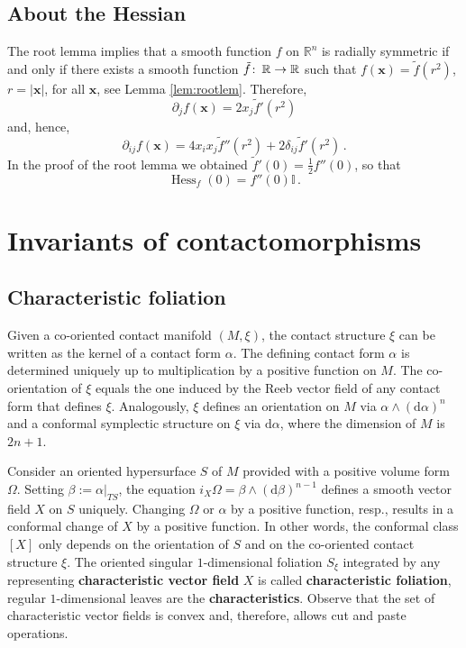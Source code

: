 \documentclass{amsart}
\theoremstyle{definition}
\def\co{\colon\thinspace}
\newcommand{\rmd}{\mathrm d}
\newcommand{\R}{\mathbb R}
\newcommand{\bfx}{\mathbf x}
\newcommand{\ra}{\rightarrow}
\DeclareMathOperator{\Hess}{\mathrm{Hess}}
\begin{document}

\subsection{About the Hessian\label{subsec:hess}}


The root lemma implies
that a smooth function $f$ on $\R^n$
is radially symmetric if and only if
there exists a smooth function $\tilde{f}\co\R\ra\R$
such that $f(\bfx)=\tilde{f}(r^2)$, $r=|\bfx|$,
for all $\bfx$,
see Lemma \ref{lem:rootlem}.
Therefore,
\[
\partial_jf(\bfx)
=2x_j\tilde{f}'(r^2)
\]
and, hence,
\[
\partial_{ij}f(\bfx)
=4x_ix_j\tilde{f}''(r^2)
+2\delta_{ij}\tilde{f}'(r^2)
\,.
\]
In the proof of the root lemma we obtained
$\tilde{f}'(0)=\frac12f''(0)$,
so that
\[
\Hess_f(0)=f''(0)\mathbb{I}
\,.
\]




\section{Invariants of contactomorphisms\label{sec:invofcontactom}}




\subsection{Characteristic foliation\label{subsec:chrfol}}


Given a co-oriented contact manifold $(M,\xi)$,
the contact structure $\xi$
can be written as the kernel of a contact form $\alpha$.
The defining contact form $\alpha$ is determined uniquely
up to multiplication by a positive function on $M$.
The co-orientation of $\xi$ equals the one induced by the Reeb vector field
of any contact form that defines $\xi$.
Analogously,
$\xi$ defines an orientation on $M$ via $\alpha\wedge(\rmd\alpha)^n$
and a conformal symplectic structure on $\xi$ via $\rmd\alpha$,
where the dimension of $M$ is $2n+1$.

Consider an oriented hypersurface $S$ of $M$
provided with a positive volume form $\Omega$.
Setting $\beta:=\alpha|_{TS}$,
the equation $i_X\Omega=\beta\wedge(\rmd\beta)^{n-1}$
defines a smooth vector field $X$ on $S$ uniquely.
Changing $\Omega$ or $\alpha$ by a positive function, resp.,
results in a conformal change of $X$ by a positive function.
In other words,
the conformal class $[X]$ only depends on the orientation of $S$
and on the co-oriented contact structure $\xi$.
The oriented singular $1$-dimensional foliation $S_{\xi}$
integrated by any representing {\bf characteristic vector field} $X$
is called {\bf characteristic foliation},
regular $1$-dimensional leaves are the {\bf characteristics}.
Observe that the set of characteristic vector fields is convex
and, therefore, allows cut and paste operations.
\end{document}
